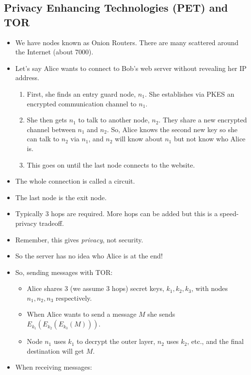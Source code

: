 \documentclass{article}
\begin{document}
\subsection{Privacy Enhancing Technologies (PET) and TOR}
\begin{itemize}
    \item We have nodes known as Onion Routers.  There are many scattered around the Internet (about 7000).
    \item Let's say Alice wants to connect to Bob's web server without revealing her IP address.
        \begin{enumerate}
            \item First, she finds an entry guard node, $n_1$.  She establishes via PKES an encrypted communication channel to $n_1$.
            \item She then gets $n_1$ to talk to another node, $n_2$.  They share a new encrypted channel between $n_1$ and $n_2$.  So, Alice knows the second new key so she can talk to $n_2$ via $n_1$, and $n_2$ will know about $n_1$ but not know who Alice is.
            \item This goes on until the last node connects to the website.
        \end{enumerate}
    \item The whole connection is called a circuit.
    \item The last node is the exit node.
    \item Typically 3 hops are required.  More hops can be added but this is a speed-privacy tradeoff.
    \item Remember, this gives \emph{privacy}, not security.
    \item So the server has no idea who Alice is at the end!
    \item So, sending messages with TOR:
        \begin{itemize}
            \item Alice shares 3 (we assume 3 hops) secret keys, $k_1, k_2, k_3$, with nodes $n_1, n_2, n_3$ respectively.
            \item When Alice wants to send a message $M$ she sends $E_{k_1}(E_{k_2}(E_{k_3}(M)))$.
            \item Node $n_1$ uses $k_1$ to decrypt the outer layer, $n_2$ uses $k_2$, etc., and the final destination will get $M$.
        \end{itemize}
    \item When receiving messages:
        \begin{itemize}

\end{itemize}
\end{itemize}
\end{document}
